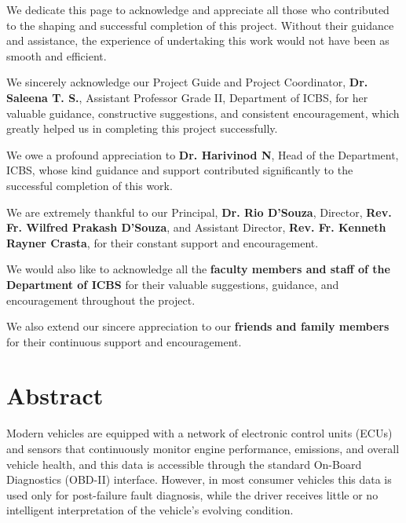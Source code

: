 \documentclass[10pt,a4paper]{report}
\begin{document}
We dedicate this page to acknowledge and appreciate all those who contributed to the shaping and successful completion of this project. Without their guidance and assistance, the experience of undertaking this work would not have been as smooth and efficient.
\par
\vspace{0.15in}
\noindent We sincerely acknowledge our Project Guide and Project Coordinator, \textbf{Dr. Saleena T. S.}, Assistant Professor Grade II, Department of ICBS, for her valuable guidance, constructive suggestions, and consistent encouragement, which greatly helped us in completing this project successfully.
\par
\vspace{0.15in}
\noindent We owe a profound appreciation to \textbf{Dr. Harivinod N}, Head of the Department, ICBS, whose kind guidance and support contributed significantly to the successful completion of this work.
\par
\vspace{0.15in}
\noindent We are extremely thankful to our Principal, \textbf{Dr. Rio D’Souza}, Director, \textbf{Rev. Fr. Wilfred Prakash D’Souza}, and Assistant Director, \textbf{Rev. Fr. Kenneth Rayner Crasta}, for their constant support and encouragement.
\par
\vspace{0.15in}
\noindent We would also like to acknowledge all the \textbf{faculty members and staff of the Department of ICBS} for their valuable suggestions, guidance, and encouragement throughout the project.
\par
\vspace{0.15in}
\noindent We also extend our sincere appreciation to our \textbf{friends and family members} for their continuous support and encouragement.

\chapter*{Abstract}

\justifying
{}

Modern vehicles are equipped with a network of electronic control units (ECUs) and sensors that continuously monitor engine performance, emissions, and overall vehicle health, and this data is accessible through the standard On-Board Diagnostics (OBD-II) interface. However, in most consumer vehicles this data is used only for post-failure fault diagnosis, while the driver receives little or no intelligent interpretation of the vehicle's evolving condition.
\end{document}
